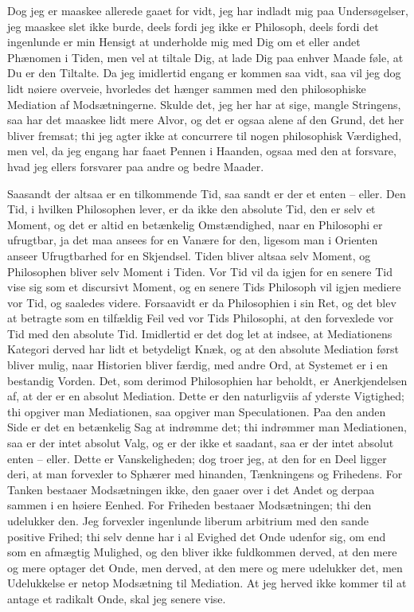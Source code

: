 \documentclass[12pt,a4paper]{article}
\begin{document}
Dog jeg er maaskee allerede gaaet for vidt, jeg har indladt mig paa Undersøgelser, jeg maaskee slet ikke burde, deels fordi jeg ikke er Philosoph, deels fordi det ingenlunde er min Hensigt at underholde mig med Dig om et eller andet Phænomen i Tiden, men vel at tiltale Dig, at lade Dig paa enhver Maade føle, at Du er den Tiltalte. Da jeg imidlertid engang er kommen saa vidt, saa vil jeg dog lidt nøiere overveie, hvorledes det hænger sammen med den philosophiske Mediation af Modsætningerne. Skulde det, jeg her har at sige, mangle Stringens, saa har det maaskee lidt mere Alvor, og det er ogsaa alene af den Grund, det her bliver fremsat; thi jeg agter ikke at concurrere til nogen philosophisk Værdighed, men vel, da jeg engang har faaet Pennen i Haanden, ogsaa med den at forsvare, hvad jeg ellers forsvarer paa andre og bedre Maader.

Saasandt der altsaa er en tilkommende Tid, saa sandt er der et enten – eller. Den Tid, i hvilken Philosophen lever, er da ikke den absolute Tid, den er selv et Moment, og det er altid en betænkelig Omstændighed, naar en Philosophi er ufrugtbar, ja det maa ansees for en Vanære for den, ligesom man i Orienten anseer Ufrugtbarhed for en Skjendsel. Tiden bliver altsaa selv Moment, og Philosophen bliver selv Moment i Tiden. Vor Tid vil da igjen for en senere Tid vise sig som et discursivt Moment, og en senere Tids Philosoph vil igjen mediere vor Tid, og saaledes videre. Forsaavidt er da Philosophien i sin Ret, og det blev at betragte som en tilfældig Feil ved vor Tids Philosophi, at den forvexlede vor Tid med den absolute Tid. Imidlertid er det dog let at indsee, at Mediationens Kategori derved har lidt et betydeligt Knæk, og at den absolute Mediation først bliver mulig, naar Historien bliver færdig, med andre Ord, at Systemet er i en bestandig Vorden. Det, som derimod Philosophien har beholdt, er Anerkjendelsen af, at der er en absolut Mediation. Dette er den naturligviis af yderste Vigtighed; thi opgiver man Mediationen, saa opgiver man Speculationen. Paa den anden Side er det en betænkelig Sag at indrømme det; thi indrømmer man Mediationen, saa er der intet absolut Valg, og er der ikke et saadant, saa er der intet absolut enten – eller. Dette er Vanskeligheden; dog troer jeg, at den for en Deel ligger deri, at man forvexler to Sphærer med hinanden, Tænkningens og Frihedens. For Tanken bestaaer Modsætningen ikke, den gaaer over i det Andet og derpaa sammen i en høiere Eenhed. For Friheden bestaaer Modsætningen; thi den udelukker den. Jeg forvexler ingenlunde liberum arbitrium med den sande positive Frihed; thi selv denne har i al Evighed det Onde udenfor sig, om end som en afmægtig Mulighed, og den bliver ikke fuldkommen derved, at den mere og mere optager det Onde, men derved, at den mere og mere udelukker det, men Udelukkelse er netop Modsætning til Mediation. At jeg herved ikke kommer til at antage et radikalt Onde, skal jeg senere vise.
\end{document}
